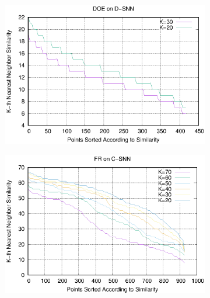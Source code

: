 \documentclass[preprint,12pt,authoryear,review]{elsarticle}
\begin{document}
\begin{figure}[!htbp]
\begin{subfigure}[b]{0.37\textwidth}
        \label{fig:doe_tun_csnn}
    \end{subfigure}
    \begin{subfigure}[b]{0.37\textwidth}
        \includegraphics[width=\textwidth]{DOE_D-SNN.eps}
        \label{fig:doe_tun_dsnn}
    \end{subfigure}
    \begin{subfigure}[b]{0.37\textwidth}
        \includegraphics[width=\textwidth]{FR_C-SNN.eps}
        \label{fig:fr_tun_csnn}
    \end{subfigure}
    \begin{subfigure}[b]{0.37\textwidth}

\end{subfigure}
\end{figure}
\end{document}
